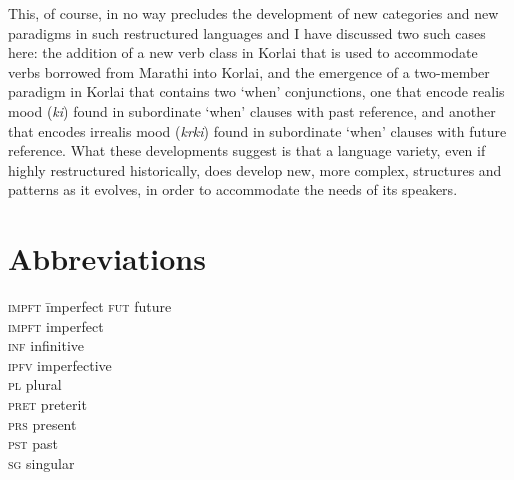 \documentclass[output=paper,colorlinks,citecolor=brown]{langscibook}
\begin{document}
This, of course, in no way precludes the development of new categories and new paradigms in such restructured languages and I have discussed two such cases here: the addition of a new verb class in Korlai that is used to accommodate verbs borrowed from Marathi into Korlai, and the emergence of a two-member paradigm in Korlai that contains two `when' conjunctions, one that encode realis mood (\textit{ki}) found in subordinate `when' clauses with past reference, and another that encodes irrealis mood (\textit{k\textopeno rki}) found in subordinate `when' clauses with future reference. What these developments suggest is that a language variety, even if highly restructured historically, does develop new, more complex, structures and patterns as it evolves, in order to accommodate the needs of its speakers.

\section*{Abbreviations}

\begin{multicols}{3}
\begin{tabbing}
\textsc{impft}\hspace{.5ex} \= imperfect  \kill
\textsc{fut} \> future \\
\textsc{impft} \> imperfect  \\
\textsc{inf} \> infinitive  \\
\textsc{ipfv} \> imperfective  \\
\textsc{pl} \> plural \\
\textsc{pret} \> preterit \\
\textsc{prs} \> present\\
\textsc{pst} \> past  \\
\textsc{sg} \> singular
\end{tabbing}
\end{multicols}

\printbibliography[heading=subbibliography,notkeyword=this]
\end{document}
